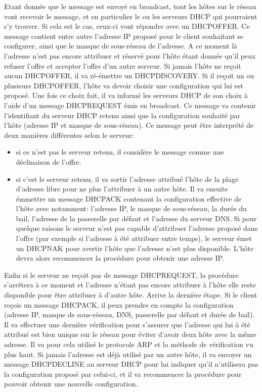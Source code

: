 Etant donnée que le message est envoyé en broadcast, tout les hôtes sur le
réseau vont recevoir le message, et en particulier le ou les serveurs DHCP qui
pourraient s'y trouver. Si cela est le cas, ceux-ci vont répondre avec un
DHCPOFFER. Ce message contient entre autre l'adresse IP proposé pour le client
souhaitant se configurer, ainsi que le masque de sous-réseau de l'adresse. A ce
moment là l'adresse n'est pas encore attribuer et réservé pour l'hôte étant
donnée qu'il peux refuser l'offre et accepter l'offre d'un autre serveur. Si
jamais l'hôte ne reçoit aucun DHCPOFFER, il va ré-émettre un DHCPDISCOVERY. Si
il reçoit un ou plusieurs DHCPOFFER, l'hôte va devoir choisir une configuration
qui lui est proposé. Une fois ce choix fait, il va informé les serveurs DHCP de
son choix à l'aide d'un message DHCPREQUEST émis en broadcast. Ce message va
contenir l'identifiant du serveur DHCP retenu ainsi que la configuration
souhaité par l'hôte (adresse IP et masque de sous-réseau). Ce message peut être
interprété de deux manières différentes selon le serveur:
\begin{itemize}
\item si ce n'est pas le serveur retenu, il considère le message comme une
déclinaison de l'offre.

\item si c'est le serveur retenu, il va sortir l'adresse attribué l'hôte de la
plage d'adresse libre pour ne plus l'attribuer à un autre hôte. Il va ensuite
émmettre un message DHCPACK contenant la configuration effective de l'hôte avec
notamment: l'adresse IP, le masque de sous-réseau, la durée du bail, l'adresse
de la passerelle par défaut et l'adresse du serveur DNS.  Si pour quelque
raisons le serveur n'est pas capable d'attribuer l'adresse proposé dans l'offre
(par exemple si l'adresse à été attribuer entre temps), le serveur émet un
DHCPNAK pour avertir l'hôte que l'adresse n'est plus disponible. L'hôte devra
alors recommencer la procédure pour obtenir une adresse IP.
\end{itemize}

Enfin si le serveur ne reçoit pas de message DHCPREQUEST, la procédure
s'arrêtera à ce moment et l'adresse n'étant pas encore attribuer à l'hôte elle
reste disponible pour être attribuer à d'autre hôte.  Arrive la dernière étape.
Si le client reçois un message DHCPACK, il peux prendre en compte la
configuration (adresse IP, masque de sous-réseau, DNS, passerelle par défaut et
durée de bail). Il va effectuer une dernière vérification pour s'assurer que
l'adresse qui lui à été attribué est bien unique sur le réseau pour éviter
d'avoir deux hôte avec la même adresse. Il va pour cela utilisé le protocole
ARP et la méthode de vérification vu plus haut. Si jamais l'adresse est déjà
utilisé par un autre hôte, il va envoyer un message DHCPDECLINE au serveur DHCP
pour lui indiquer qu'il n'utilisera pas la configuration proposé par celui-ci,
et il va recommencer la procédure pour pouvoir obtenir une nouvelle
configuration.

